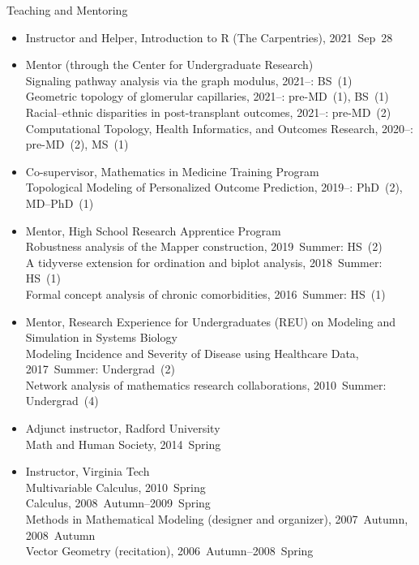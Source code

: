 \documentclass[10pt,a4paper]{article}
\begin{document}
\vspace{.25cm}
{\sc Teaching and Mentoring}
\begin{itemize}[label=$\circ$,nolistsep]
\item
Instructor and Helper, Introduction to R (The Carpentries), 2021~Sep~28
\item
Mentor (through the Center for Undergraduate Research) \\
Signaling pathway analysis via the graph modulus, 2021--: BS~(1) \\
Geometric topology of glomerular capillaries, 2021--: pre-MD~(1), BS~(1) \\
Racial--ethnic disparities in post-transplant outcomes, 2021--: pre-MD~(2) \\
Computational Topology, Health Informatics, and Outcomes Research, 2020--: pre-MD~(2), MS~(1)
\item
Co-supervisor, Mathematics in Medicine Training Program \\
Topological Modeling of Personalized Outcome Prediction, 2019--: PhD~(2), MD--PhD~(1)
\item
Mentor, High School Research Apprentice Program \\
Robustness analysis of the Mapper construction, 2019~Summer: HS~(2) \\
A tidyverse extension for ordination and biplot analysis, 2018~Summer: HS~(1) \\
Formal concept analysis of chronic comorbidities, 2016~Summer: HS~(1)
\item
Mentor, Research Experience for Undergraduates (REU) on Modeling and Simulation in Systems Biology \\
Modeling Incidence and Severity of Disease using Healthcare Data, 2017~Summer: Undergrad~(2) \\
Network analysis of mathematics research collaborations, 2010~Summer: Undergrad~(4)
\item
Adjunct instructor, Radford University \\
Math and Human Society, 2014~Spring
\item
Instructor, Virginia Tech \\
Multivariable Calculus, 2010~Spring \\
Calculus, 2008~Autumn--2009~Spring \\
Methods in Mathematical Modeling (designer and organizer), 2007~Autumn, 2008~Autumn \\
Vector Geometry (recitation), 2006~Autumn--2008~Spring

\end{itemize}
\end{document}
